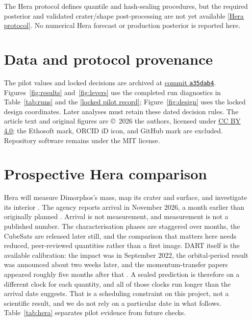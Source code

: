 \documentclass[10pt,twocolumn]{article}
\newcommand{\repo}[2]{\href{https://github.com/Yagiz-D-Ekrem-Dolar/dart-rift/blob/a35dab4/#1}{#2}}
\begin{document}
The Hera protocol defines quantile and hash-sealing
procedures, but the required posterior and validated
crater/shape post-processing are not yet available
\repo{docs/truba/PROTOKOL-HT-HERA-TAHMIN.md}{[Hera protocol]}.
No numerical Hera forecast or production posterior is
reported here.

\section*{Data and protocol provenance}
The pilot values and locked decisions are archived at
\href{https://github.com/Yagiz-D-Ekrem-Dolar/dart-rift/tree/a35dab4}{commit \texttt{a35dab4}}.
Figures~\ref{fig:results} and~\ref{fig:levers} use the completed
run diagnostics in Table~\ref{tab:runs} and the
\repo{docs/defter/KAYIT-076_2026-10-06_DO-DC-DN-uc-kilitli-yargi.md}{[locked pilot record]};
Figure~\ref{fig:design} uses the locked design coordinates.
Later analyses must retain these dated
decision rules. The article text and original figures are
\copyright\ 2026 the authors, licensed under
\href{https://creativecommons.org/licenses/by/4.0/}{CC BY 4.0};
the Ethosoft mark, ORCID iD icon, and GitHub mark are excluded. Repository
software remains under the MIT license.

\FloatBarrier
\section*{Prospective Hera comparison}
Hera will measure Dimorphos's mass, map its crater and surface,
and investigate its interior \cite{esaHera}. The agency reports
arrival in November 2026, a month earlier than originally planned
\cite{esaArrival}. Arrival is not measurement, and measurement is not a
published number. The characterisation phases are staggered over
months, the CubeSats are released later still, and the comparison that
matters here needs reduced, peer-reviewed quantities rather than a
first image. DART itself is the available calibration: the impact was
in September 2022, the orbital-period result was announced about two
weeks later, and the momentum-transfer papers appeared roughly five
months after that \cite{cheng2023}. A sealed prediction is therefore on
a different clock for each quantity, and all of those clocks run longer
than the arrival date suggests. That is a scheduling constraint on this
project, not a scientific result, and we do not rely on a particular
date in what follows.
Table~\ref{tab:hera} separates pilot evidence from future checks.
\end{document}
